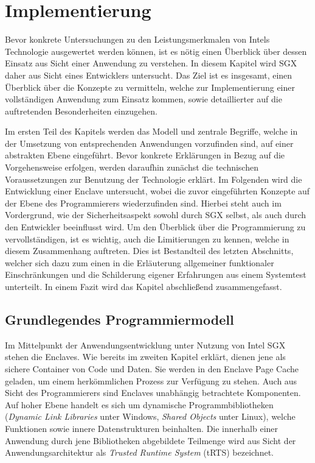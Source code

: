 \chapter{Implementierung}

Bevor konkrete Untersuchungen zu den Leistungsmerkmalen von Intels Technologie ausgewertet werden können, ist es nötig einen Überblick über dessen Einsatz aus Sicht einer Anwendung zu verstehen. In diesem Kapitel wird SGX daher aus Sicht eines Entwicklers untersucht. Das Ziel ist es insgesamt, einen Überblick über die Konzepte zu vermitteln, welche zur Implementierung einer vollständigen Anwendung zum Einsatz kommen, sowie detaillierter auf die auftretenden Besonderheiten einzugehen.

Im ersten Teil des Kapitels werden das Modell und zentrale Begriffe, welche in der Umsetzung von entsprechenden Anwendungen vorzufinden sind, auf einer abstrakten Ebene eingeführt. Bevor konkrete Erklärungen in Bezug auf die Vorgehensweise erfolgen, werden daraufhin zunächst die technischen Voraussetzungen zur Benutzung der Technologie erklärt. Im Folgenden wird die Entwicklung einer Enclave untersucht, wobei die zuvor eingeführten Konzepte auf der Ebene des Programmierers wiederzufinden sind. Hierbei steht auch im Vordergrund, wie der Sicherheitsaspekt sowohl durch SGX selbst, als auch durch den Entwickler beeinflusst wird. Um den Überblick über die Programmierung zu vervollständigen, ist es wichtig, auch die Limitierungen zu kennen, welche in diesem Zusammenhang auftreten. Dies ist Bestandteil des letzten Abschnitts, welcher sich dazu zum einen in die Erläuterung allgemeiner funktionaler Einschränkungen und die Schilderung eigener Erfahrungen aus einem Systemtest unterteilt. In einem Fazit wird das Kapitel abschließend zusammengefasst.

\section{Grundlegendes Programmiermodell}

Im Mittelpunkt der Anwendungsentwicklung unter Nutzung von Intel SGX stehen die Enclaves. Wie bereits im zweiten Kapitel erklärt, dienen jene als sichere Container von Code und Daten. Sie werden in den Enclave Page Cache geladen, um einem herkömmlichen Prozess zur Verfügung zu stehen. Auch aus Sicht des Programmierers sind Enclaves unabhängig betrachtete Komponenten. Auf hoher Ebene handelt es sich um dynamische Programmbibliotheken (\textit{Dynamic Link Libraries} unter Windows,  \textit{Shared Objects} unter Linux), welche Funktionen sowie innere Datenstrukturen beinhalten. Die innerhalb einer Anwendung durch jene Bibliotheken abgebildete Teilmenge wird aus Sicht der Anwendungsarchitektur als \textit{Trusted Runtime System} (tRTS) bezeichnet.

